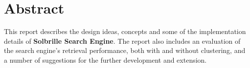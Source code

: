 \chapter*{Abstract} 
\thispagestyle{empty} %
This report describes the design ideas, concepts and some of the implementation details of {\bf Solbrille Search Engine}. The report also includes an evaluation of the search engine's retrieval performance, both with and without clustering, and a number of suggestions for the further development and extension.